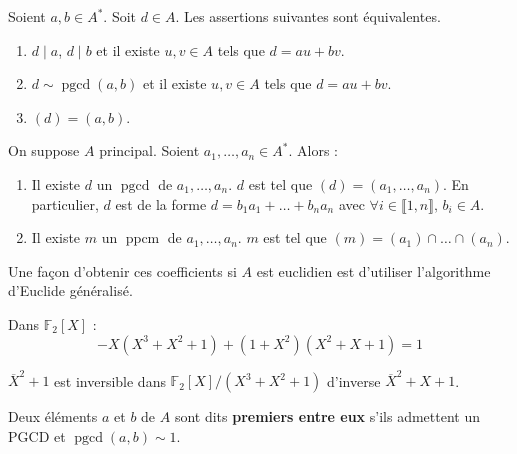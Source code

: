  \begin{proposition}
    Soient $a, b \in A^*$. Soit $d \in A$. Les assertions suivantes sont équivalentes.
    \begin{enumerate}[label=(\roman*)]
      \item $d \mid a$, $d \mid b$ et il existe $u, v \in A$ tels que $d = au + bv$.
      \item $d \sim \operatorname{pgcd}(a, b)$ et il existe $u, v \in A$ tels que $d = au + bv$.
      \item $(d) = (a,b)$.
    \end{enumerate}
  \end{proposition}

	\begin{theorem}
		On suppose $A$ principal. Soient $a_1, \dots, a_n \in A^*$. Alors :
		\begin{enumerate}[label=(\roman*)]
			\item Il existe $d$ un $\operatorname{pgcd}$ de $a_1, \dots, a_n$. $d$ est tel que $(d) = (a_1, \dots, a_n)$. En particulier, $d$ est de la forme $d = b_1 a_1 + \dots + b_n a_n$ avec $\forall i \in \llbracket 1, n \rrbracket, \, b_i \in A$.
			\item Il existe $m$ un $\operatorname{ppcm}$ de $a_1, \dots, a_n$. $m$ est tel que $(m) = (a_1) \cap \dots \cap (a_n)$.
		\end{enumerate}
	\end{theorem}

	\begin{remark}
		Une façon d'obtenir ces coefficients si $A$ est euclidien est d'utiliser l'algorithme d'Euclide généralisé.
	\end{remark}


	\begin{example}
		Dans $\mathbb{F}_2[X]$ :
		\[ -X(X^3+X^2+1) + (1+X^2)(X^2+X+1) = 1 \]
	\end{example}

	\begin{application}
		$\overline{X}^2+1$ est inversible dans $\mathbb{F}_2[X]/(X^3 + X^2 + 1)$ d'inverse $\overline{X}^2+X+1$.
	\end{application}


	\begin{definition}
		Deux éléments $a$ et $b$ de $A$ sont dits \textbf{premiers entre eux} s'ils admettent un PGCD et $\operatorname{pgcd}(a,b) \sim 1$.
	\end{definition}

